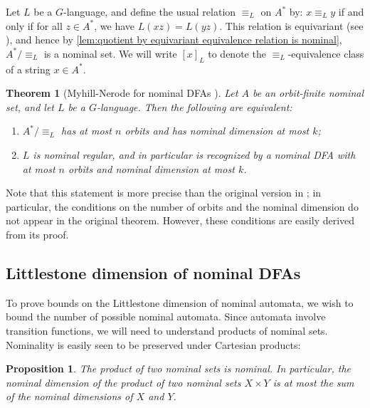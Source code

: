 \documentclass[11pt,a4paper]{amsart}
\newtheorem{theorem}{Theorem}
\newtheorem{proposition}{Proposition}
\theoremstyle{definition}
\newif\ifappendix
\begin{document}
Let $L$ be a $G$-language, and define the usual relation $\equiv_L$ on $A^*$ by: $x \equiv_L y$ if and only if for all $z \in A^*$, we have $L(xz) = L(yz)$. 
This relation is equivariant (see \cite[Lemma 3.4]{bojanczyk-klin-lasota:automata-theory-in-nominal-sets}), and hence by \autoref{lem:quotient by equivariant equivalence relation is nominal}, $A^* / \equiv_L$ is a nominal set.
We will write $[x]_L$ to denote the $\equiv_L$-equivalence class of a string $x \in A^*$.

\begin{theorem}[Myhill-Nerode for nominal DFAs {\cite[Theorem 5.2]{bojanczyk-klin-lasota:automata-theory-in-nominal-sets}}] \label{thm:nominal myhill-nerode}
    Let $A$ be an orbit-finite nominal set, and let $L$ be a $G$-language.
    Then the following are equivalent:
    \begin{enumerate}
        \item $A^* / \equiv_L$ has at most $n$ orbits and has nominal dimension at most $k$;
        \item $L$ is nominal regular, and in particular is recognized by a nominal DFA with at most $n$ orbits and nominal dimension at most $k$.
    \end{enumerate}
\end{theorem}

Note that this statement is more precise than the original version in \cite{bojanczyk-klin-lasota:automata-theory-in-nominal-sets}; in particular, the conditions on the number of orbits and the nominal dimension do not appear in the original theorem.
However, these conditions are easily derived from its proof. 
\ifappendix For completeness, a proof of the correspondence between the number of orbits and the nominal dimension is given in Appendix \ref{appendix:proof of nominal myhill-nerode}. \fi




\subsection{Littlestone dimension of nominal DFAs}

To prove bounds on the Littlestone dimension of nominal automata, we wish to bound the number of possible nominal automata. Since automata involve transition functions, we will need to understand products of nominal sets.
Nominality is easily seen to be preserved under Cartesian products:

\begin{proposition}\label{prop:dimension of product}
    The product of two nominal sets is nominal. 
    In particular, the nominal dimension of the product of two nominal sets $X \times Y$ is at most the sum of the nominal dimensions of $X$ and $Y$.
\end{proposition}
\end{document}
